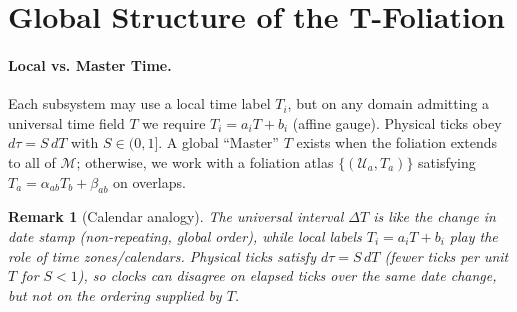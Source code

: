 \documentclass[12pt]{article}
\theoremstyle{plain} %
\newtheorem{remark}{Remark}
\begin{document}
\section*{}

\appendix
\section{Global Structure of the T-Foliation}

\paragraph{Local vs. Master Time.}
Each subsystem may use a local time label $T_i$, but on any domain admitting a universal time field $T$ we require $T_i = a_i T + b_i$ (affine gauge). Physical ticks obey $d\tau = S\,dT$ with $S\in(0,1]$. A global “Master” $T$ exists when the foliation extends to all of $\mathcal{M}$; otherwise, we work with a foliation atlas $\{(\mathcal{U}_a, T_a)\}$ satisfying $T_a = \alpha_{ab}T_b + \beta_{ab}$ on overlaps.

\newpage

\begin{figure}[h]
\centering
{}
\end{figure}

\begin{remark}[Calendar analogy]
The universal interval $\Delta T$ is like the change in date stamp (non-repeating, global order), while local labels $T_i=a_iT+b_i$ play the role of time zones/calendars. Physical ticks satisfy $d\tau=S\,dT$ (fewer ticks per unit $T$ for $S<1$), so clocks can disagree on elapsed ticks over the same date change, but not on the ordering supplied by $T$.
\end{remark}
\end{document}

